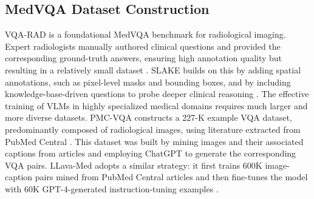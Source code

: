 \documentclass[bioengineering,article,submit,pdftex,moreauthors]{Definitions/mdpi}
\begin{document}
\subsection{MedVQA Dataset Construction}
VQA-RAD is a foundational MedVQA benchmark for radiological imaging. 
Expert radiologists manually authored clinical questions and provided the corresponding ground-truth answers, ensuring high annotation quality but resulting in a relatively small dataset \cite{lau_dataset_2018}. 
SLAKE builds on this by adding spatial annotations, such as pixel-level masks and bounding boxes, and by including knowledge-base-driven questions to probe deeper clinical reasoning \cite{liu_slake_2021}.
The effective training of VLMs in highly specialized medical domains requires much larger and more diverse datasets. 
PMC-VQA constructs a 227-K example VQA dataset, predominantly composed of radiological images, using literature extracted from PubMed Central \cite{zhang_pmc-vqa_2024}.
This dataset was built by mining images and their associated captions from articles and employing ChatGPT to generate the corresponding VQA pairs.
LLava-Med adopts a similar strategy: it first trains 600K image-caption pairs mined from PubMed Central articles and then fine-tunes the model with 60K GPT-4-generated instruction-tuning examples \cite{li_llava-med_2023}.

\end{document}
